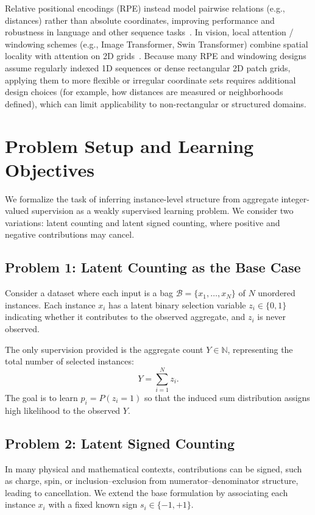 \documentclass{article}
\theoremstyle{plain}
\theoremstyle{definition}
\theoremstyle{remark}
\begin{document}
Relative positional encodings (RPE) instead model pairwise relations (e.g., distances) rather than absolute coordinates, improving performance and robustness in language and other sequence tasks~\cite{shaw2018self,dai2019transformer}.
In vision,
local attention / windowing schemes (e.g., Image Transformer, Swin Transformer)
combine spatial locality with attention on 2D grids~\cite{parmar2018image,liu2021swin}.
Because many RPE and windowing designs assume regularly indexed 1D sequences
or dense rectangular 2D patch grids, applying them to more flexible or irregular
coordinate sets requires additional design choices (for example,
how distances are measured or neighborhoods defined), which can limit
applicability to non-rectangular or structured domains.
	
\section{Problem Setup and Learning Objectives}
\label{sec:problem_formulation}

We formalize the task of inferring instance-level structure from aggregate integer-valued supervision as a weakly supervised learning problem. We consider two variations: latent counting and latent signed counting, where positive and negative contributions may cancel.

\subsection{Problem 1: Latent Counting as the Base Case}
Consider a dataset where each input is a bag $\mathcal{B} = \{x_1, \dots, x_N\}$ of $N$ unordered instances. Each instance $x_i$ has a latent binary selection variable $z_i \in \{0,1\}$ indicating whether it contributes to the observed aggregate, and $z_i$ is never observed.

The only supervision provided is the aggregate count $Y \in \mathbb{N}$, representing the total number of selected instances:
\[
    Y = \sum_{i=1}^N z_i.
\]
The goal is to learn $p_i=P(z_i=1)$ so that the induced sum distribution assigns high likelihood to the observed $Y$.

\subsection{Problem 2: Latent Signed Counting}
In many physical and mathematical contexts, contributions can be signed, such as charge, spin, or inclusion--exclusion from numerator--denominator structure, leading to cancellation. We extend the base formulation by associating each instance $x_i$ with a fixed known sign $s_i \in \{-1,+1\}$.
\end{document}
